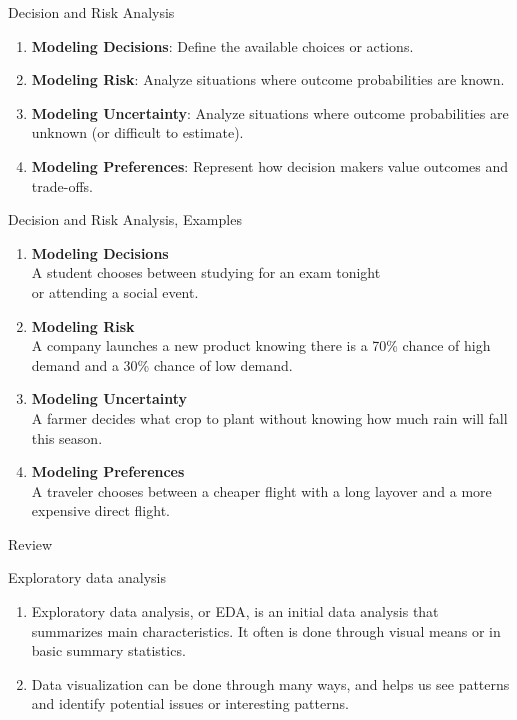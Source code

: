 \documentclass[12pt]{beamer}
\newcommand{\vocab}[1]{\textcolor{AggieMaroon}{\textbf{#1}}}
\begin{document}

\begin{frame}{}
\begin{block}{Decision and Risk Analysis}
\begin{enumerate}
\item \vocab{Modeling Decisions}: Define the available choices or actions.
\item \vocab{Modeling Risk}: Analyze situations where outcome probabilities are known.
\item \vocab{Modeling Uncertainty}: Analyze situations where outcome probabilities are unknown (or difficult to estimate).
\item \vocab{Modeling Preferences}: Represent how decision makers value outcomes and trade-offs.
\end{enumerate}
\end{block}
\end{frame}

\begin{frame}{}
\begin{block}{Decision and Risk Analysis, Examples}
\begin{enumerate}
\item \vocab{Modeling Decisions}\\A student chooses between studying for an exam tonight\\or attending a social event.
\item \vocab{Modeling Risk}\\A company launches a new product knowing there is a 70\% chance of high demand and a 30\% chance of low demand.
\item \vocab{Modeling Uncertainty}\\A farmer decides what crop to plant without knowing how much rain will fall this season.
\item \vocab{Modeling Preferences}\\A traveler chooses between a cheaper flight with a long layover and a more expensive direct flight.
\end{enumerate}
\end{block}
\end{frame}

\begin{frame}{Review}
\begin{block}{Exploratory data analysis}
\begin{enumerate}
\item Exploratory data analysis, or EDA, is an initial data analysis that summarizes main characteristics. It often is done through visual means or in basic summary statistics.
\item Data visualization can be done through many ways, and helps us see patterns and identify potential issues or interesting patterns.
\end{enumerate}
\end{block}
\end{frame}
\end{document}
